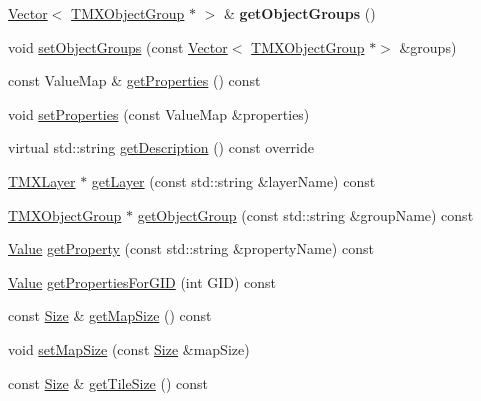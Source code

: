 \begin{DoxyCompactItemize}
\mbox{\label{classexperimental_1_1TMXTiledMap_a7d5ef5a94a8931776d415fb43fae2f58}} 
\hyperlink{classVector}{Vector}$<$ \hyperlink{classTMXObjectGroup}{T\+M\+X\+Object\+Group} $\ast$ $>$ \& {\bfseries get\+Object\+Groups} ()
\item 
void \hyperlink{classexperimental_1_1TMXTiledMap_a8b7f577b6cf97be3da8b52da3ab4eede}{set\+Object\+Groups} (const \hyperlink{classVector}{Vector}$<$ \hyperlink{classTMXObjectGroup}{T\+M\+X\+Object\+Group} $\ast$$>$ \&groups)
\item 
const Value\+Map \& \hyperlink{classexperimental_1_1TMXTiledMap_a0a7b61ee56efbb545d279fe3e8903f54}{get\+Properties} () const
\item 
void \hyperlink{classexperimental_1_1TMXTiledMap_ab541c2f4c3ce22c25d2597152eb53833}{set\+Properties} (const Value\+Map \&properties)
\item 
virtual std\+::string \hyperlink{classexperimental_1_1TMXTiledMap_adf91a0a108c7e78b84716cd926d96113}{get\+Description} () const override
\item 
\hyperlink{classexperimental_1_1TMXLayer}{T\+M\+X\+Layer} $\ast$ \hyperlink{classexperimental_1_1TMXTiledMap_a4dce6f5fba13afb702d1c2cb62397f1e}{get\+Layer} (const std\+::string \&layer\+Name) const
\item 
\hyperlink{classTMXObjectGroup}{T\+M\+X\+Object\+Group} $\ast$ \hyperlink{classexperimental_1_1TMXTiledMap_a228acd16694e514f7bf80fcd66eae937}{get\+Object\+Group} (const std\+::string \&group\+Name) const
\item 
\hyperlink{classValue}{Value} \hyperlink{classexperimental_1_1TMXTiledMap_abaa5b2b023b8b44f71c6bbfcafe1adce}{get\+Property} (const std\+::string \&property\+Name) const
\item 
\hyperlink{classValue}{Value} \hyperlink{classexperimental_1_1TMXTiledMap_a0cf03d2887243f2ac3c25e6d1102e1c0}{get\+Properties\+For\+G\+ID} (int G\+ID) const
\item 
const \hyperlink{classSize}{Size} \& \hyperlink{classexperimental_1_1TMXTiledMap_a4c7f3f5487c6c8e8e597dfbba31e7659}{get\+Map\+Size} () const
\item 
void \hyperlink{classexperimental_1_1TMXTiledMap_a95bc2de4bdd3fe14b4559b81f16aab50}{set\+Map\+Size} (const \hyperlink{classSize}{Size} \&map\+Size)
\item 
const \hyperlink{classSize}{Size} \& \hyperlink{classexperimental_1_1TMXTiledMap_a4b40738cbf1cc2e30bef4e3dd1a8d3aa}{get\+Tile\+Size} () const
\item 
$$
\end{DoxyCompactItemize}
